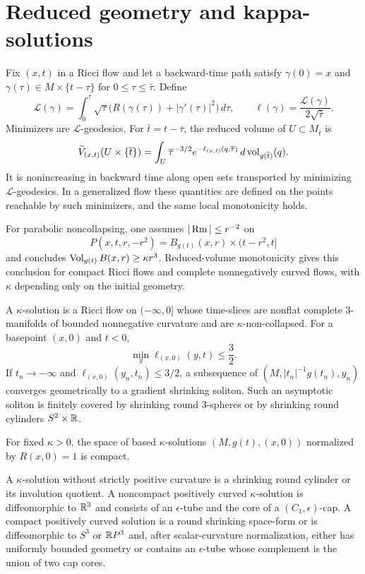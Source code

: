 \section{Reduced geometry and kappa-solutions}

Fix $(x,t)$ in a Ricci flow and let a backward-time path satisfy
$\gamma(0)=x$ and $\gamma(\tau)\in M\times\{t-\tau\}$ for
$0\leq\tau\leq\bar\tau$. Define
\[
  {\mathcal L}(\gamma)=
  \int_0^{\bar\tau}\sqrt\tau
  \bigl(R(\gamma(\tau))+|\gamma'(\tau)|^2\bigr)\,d\tau,
  \qquad
  \ell(\gamma)=\frac{{\mathcal L}(\gamma)}{2\sqrt{\bar\tau}}.
\]
Minimizers are ${\mathcal L}$-geodesics. For $\bar t=t-\bar\tau$, the reduced
volume of $U\subset M_{\bar t}$ is
\[
  \widetilde V_{(x,t)}(U\times\{\overline t\})
  =\int_U \overline\tau^{-3/2}e^{-\ell_{(x,t)}(q,\overline\tau)}
  \,d\operatorname{vol}_{g(\overline t)}(q).
\]
It is nonincreasing in backward time along open sets transported by minimizing
${\mathcal L}$-geodesics. In a generalized flow these quantities are defined
on the points reachable by such minimizers, and the same local monotonicity
holds.

For parabolic noncollapsing, one assumes
$|\operatorname{Rm}|\leq r^{-2}$ on
\[
  P(x,t,r,-r^2)=B_{g(t)}(x,r)\times(t-r^2,t]
\]
and concludes $\operatorname{Vol}_{g(t)}B(x,r)\geq\kappa r^3$. Reduced-volume monotonicity
gives this conclusion for compact Ricci flows and complete nonnegatively
curved flows, with $\kappa$ depending only on the initial geometry.

A $\kappa$-solution is a Ricci flow on $(-\infty,0]$ whose time-slices are
nonflat complete $3$-manifolds of bounded nonnegative curvature and are
$\kappa$-non-collapsed. For a basepoint $(x,0)$ and $t<0$,
\[
  \min_y\ell_{(x,0)}(y,t)\leq\frac32.
\]
If $t_n\to-\infty$ and
$\ell_{(x,0)}(y_n,t_n)\leq3/2$, a subsequence of
$(M,|t_n|^{-1}g(t_n),y_n)$ converges geometrically to a gradient shrinking
soliton. Such an asymptotic soliton is finitely covered by shrinking round
$3$-spheres or by shrinking round cylinders $S^2\times\mathbb{R}$.

\begin{theorem}
\label{thm:compactness-kappa-solutions}
For fixed $\kappa>0$, the space of based $\kappa$-solutions
$(M,g(t),(x,0))$ normalized by $R(x,0)=1$ is compact.
\end{theorem}

A $\kappa$-solution without strictly positive curvature is a shrinking round
cylinder or its involution quotient. A noncompact positively curved
$\kappa$-solution is diffeomorphic to $\mathbb{R}^3$ and consists of an
$\epsilon$-tube and the core of a $(C_1,\epsilon)$-cap. A compact positively
curved solution is a round shrinking space-form or is diffeomorphic to
$S^3$ or $\mathbb{R} P^3$ and, after scalar-curvature normalization, either has
uniformly bounded geometry or contains an $\epsilon$-tube whose complement is
the union of two cap cores.

